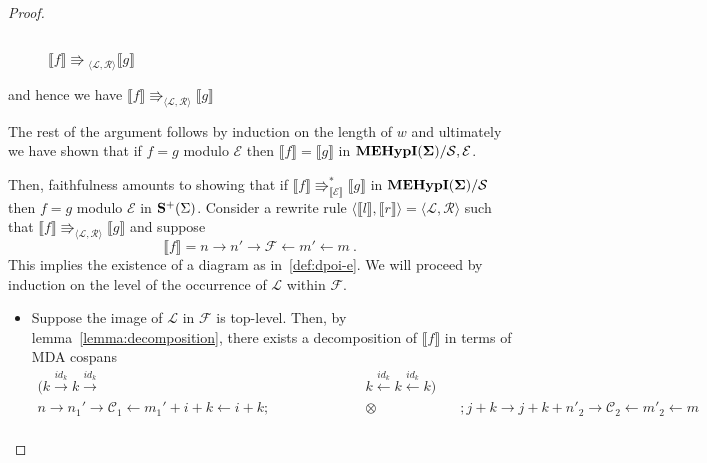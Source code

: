 \begin{proof}
\begin{itemize}
\begin{figure*}[hbt!]
\[\begin{tikzcd}
                \end{tikzcd}
                \]
                \caption{$\llbracket f \rrbracket \Rrightarrow{}_{\langle \mathcal{L},\mathcal{R} \rangle} \llbracket g \rrbracket$}
                \label{fig:f_rewrites_to_g_under_plus}
            \end{figure*}
            \fi
                and hence we have $\llbracket f \rrbracket \Rrightarrow_{\langle \mathcal{L}, \mathcal{R} \rangle} \llbracket g \rrbracket$
    \end{itemize}
    The rest of the argument follows by induction on the length of $w$ and ultimately we have shown that if $f = g$ modulo $\mathcal{E}$ then $\llbracket f \rrbracket = \llbracket g \rrbracket$  in ${\mathbf{MEHypI(\Sigma)}} / \mathcal{S}, \mathcal{E}$.

    Then, faithfulness amounts to showing that if $\llbracket f \rrbracket \Rrightarrow_{\llbracket \mathcal{E} \rrbracket}^{*} \llbracket g \rrbracket$ in ${\mathbf{MEHypI(\Sigma)}} / \mathcal{S}$ then $f = g$ modulo $\mathcal{E}$ in $\mathbf{S}^{+}(\Sigma)$.
Consider a rewrite rule $\langle \llbracket l \rrbracket, \llbracket r \rrbracket \rangle = \langle \mathcal{L}, \mathcal{R} \rangle$ such that $\llbracket f \rrbracket \Rrightarrow_{\langle \mathcal{L}, \mathcal{R} \rangle} \llbracket g \rrbracket$ and suppose
\[
	\llbracket f \rrbracket = n \xrightarrow{} n' \xrightarrow{} \mathcal{F} \xleftarrow{} m' \xleftarrow{} m ~.
\]
This implies the existence of a diagram as in~\ref{def:dpoi-e}.
We will proceed by induction on the level of the occurrence of $\mathcal{L}$ within $\mathcal{F}$.
\begin{itemize}
	\item Suppose the image of $\mathcal{L}$ in $\mathcal{F}$ is top-level.
		  Then, by lemma~\ref{lemma:decomposition}, there exists a decomposition of $\llbracket f \rrbracket$ in terms of MDA cospans
		\begin{align*}
			(k \xrightarrow{id_{k}} k \xrightarrow{id_{k}} &k \xleftarrow{id_{k}} k \xleftarrow{id_{k}} k)\\
			n \xrightarrow{} n_{1}' \xrightarrow{} \mathcal{C}_{1} \xleftarrow{} m_{1}' + i + k \xleftarrow{} i + k; \qquad\qquad\qquad &\otimes \qquad\qquad\qquad ; j + k \xrightarrow{} j + k + n'_{2} \xrightarrow{} \mathcal{C}_{2} \xleftarrow{} m'_{2} \xleftarrow{} m\\

\end{align*}
\end{itemize}
\end{proof}
